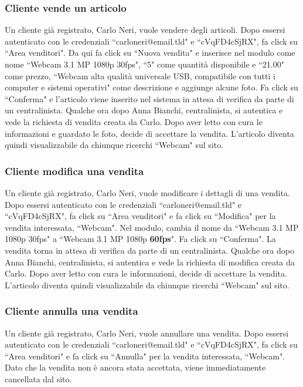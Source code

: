 \documentclass[12pt,a4paper]{article}
\begin{document}
\subsubsection{Cliente vende un articolo}
Un cliente già registrato, Carlo Neri, vuole vendere degli articoli. Dopo essersi autenticato con le credenziali ``carloneri@email.tld" e ``cVqFD4cSjRX", fa click su ``Area venditori".
Da qui fa click su ``Nuova vendita" e inserisce nel modulo come nome ``Webcam 3.1 MP 1080p 30fps", ``5" come quantità disponibile e ``21.00" come prezzo, ``Webcam alta qualità universale USB, compatibile con tutti i computer e sistemi operativi" come descrizione e aggiunge alcune foto. Fa click su ``Conferma" e l'articolo viene inserito nel sistema in attesa di verifica da parte di un centralinista.
Qualche ora dopo Anna Bianchi, centralinista, si autentica e vede la richiesta di vendita creata da Carlo. Dopo aver letto con cura le informazioni e guardato le foto, decide di accettare la vendita. L'articolo diventa quindi visualizzabile da chiunque ricerchi ``Webcam" sul sito.

\subsubsection{Cliente modifica una vendita}
Un cliente già registrato, Carlo Neri, vuole modificare i dettagli di una vendita. Dopo essersi autenticato con le credenziali ``carloneri@email.tld" e ``cVqFD4cSjRX", fa click su ``Area venditori" e fa click su ``Modifica" per la vendita interessata, ``Webcam".
Nel modulo, cambia il nome da ``Webcam 3.1 MP 1080p 30fps" a ``Webcam 3.1 MP 1080p \textbf{60fps}". Fa click su ``Conferma".
La vendita torna in attesa di verifica da parte di un centralinista.
Qualche ora dopo Anna Bianchi, centralinista, si autentica e vede la richiesta di modifica creata da Carlo. Dopo aver letto con cura le informazioni, decide di accettare la vendita. L'articolo diventa quindi visualizzabile da chiunque ricerchi ``Webcam" sul sito.

\subsubsection{Cliente annulla una vendita}
Un cliente già registrato, Carlo Neri, vuole annullare una vendita. Dopo essersi autenticato con le credenziali ``carloneri@email.tld" e ``cVqFD4cSjRX", fa click su ``Area venditori" e fa click su ``Annulla" per la vendita interessata, ``Webcam".
Dato che la vendita non è ancora stata accettata, viene immediatamente cancellata dal sito.
\end{document}
